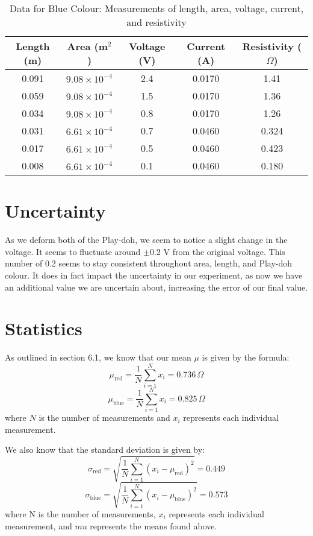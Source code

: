 \documentclass[12pt]{article}
\begin{document}
\begin{table}[H]
\caption{Data for Blue Colour: Measurements of length, area, voltage, current, and resistivity}
\centering
\begin{tabular}{|c|c|c|c|c|}
\hline
Length (m) & Area (m$^2$) & Voltage (V) & Current (A) & Resistivity ($\Omega$) \\ \hline
0.091   & $9.08 \times 10^{-4}$   & 2.4   & 0.0170  & 1.41 \\ \hline
0.059   & $9.08 \times 10^{-4}$   & 1.5   & 0.0170   & 1.36 \\ \hline
0.034   & $9.08 \times 10^{-4}$   & 0.8   & 0.0170   & 1.26 \\ \hline
0.031   & $6.61 \times 10^{-4}$   & 0.7   & 0.0460   & 0.324 \\ \hline
0.017   & $6.61 \times 10^{-4}$   & 0.5   & 0.0460   & 0.423 \\ \hline
0.008   & $6.61 \times 10^{-4}$   & 0.1   & 0.0460   & 0.180 \\ \hline
\end{tabular}
\label{tab:blue_data}
\end{table}
\section{Uncertainty}
As we deform both of the Play-doh, we seem to notice a slight change in the voltage.
It seems to fluctuate around $\pm 0.2$ V from the original voltage. This number of 0.2 seems
to stay consistent throughout area, length, and Play-doh colour.
It does in fact impact the uncertainty in our experiment, as now we have an additional value we are uncertain about,
increasing the error of our final value.
\section{Statistics}
As outlined in section 6.1, we know that our mean $\mu$ is given by the formula:
\[
\mu_{\text{red}} = \frac{1}{N} \sum_{i=1}^{N} x_i = 0.736 \, \Omega
\]
\[
\mu_{\text{blue}} = \frac{1}{N} \sum_{i=1}^{N} x_i = 0.825 \, \Omega
\]
where $N$ is the number of measurements and $x_i$ represents each individual measurement.

We also know that the standard deviation is given by:
\[
\sigma_{\text{red}} = \sqrt{\frac{1}{N} \sum_{i=1}^{N} (x_i - \mu_{\text{red}})^2} = 0.449
\]
\[
\sigma_{\text{blue}} = \sqrt{\frac{1}{N} \sum_{i=1}^{N} (x_i - \mu_{\text{blue}})^2} = 0.573
\]
where N is the number of measurements, $x_i$ represents each individual measurement, and $mu$ represents the means found above.
\end{document}
